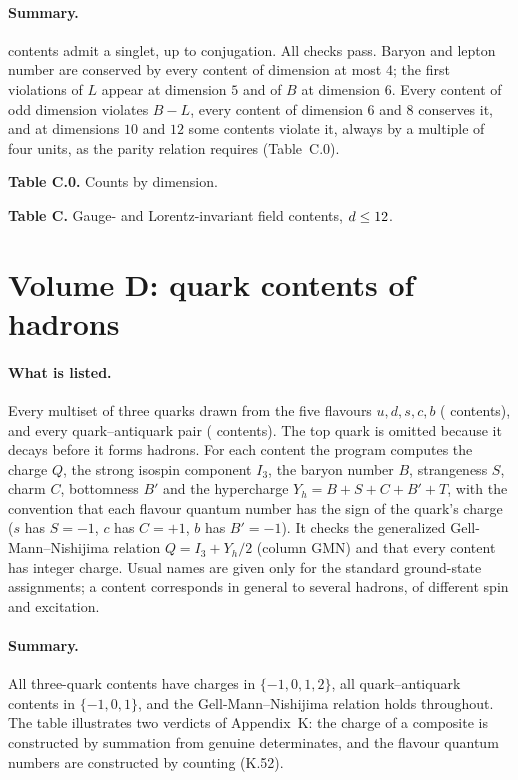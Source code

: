 \paragraph{Summary.} \vvNCfound{} contents admit a singlet, \vvNCreps{} up to conjugation. All checks pass. Baryon and lepton number are conserved by every content of dimension at most $4$; the first violations of $L$ appear at dimension $5$ and of $B$ at dimension $6$. Every content of odd dimension violates $B-L$, every content of dimension $6$ and $8$ conserves it, and at dimensions $10$ and $12$ some contents violate it, always by a multiple of four units, as the parity relation requires (Table~C.0).

\begin{center}\textbf{Table C.0.} Counts by dimension.\end{center}


\begin{center}\textbf{Table C.} Gauge- and Lorentz-invariant field contents, $d \leq 12$.\end{center}


\section{Volume D: quark contents of hadrons}\label{app:d}

\paragraph{What is listed.} Every multiset of three quarks drawn from the five flavours $u, d, s, c, b$ (\vvNDbaryons{} contents), and every quark--antiquark pair (\vvNDmesons{} contents). The top quark is omitted because it decays before it forms hadrons. For each content the program computes the charge $Q$, the strong isospin component $I_3$, the baryon number $B$, strangeness $S$, charm $C$, bottomness $B'$ and the hypercharge $Y_h = B + S + C + B' + T$, with the convention that each flavour quantum number has the sign of the quark's charge ($s$ has $S = -1$, $c$ has $C = +1$, $b$ has $B' = -1$). It checks the generalized Gell-Mann--Nishijima relation $Q = I_3 + Y_h/2$ (column GMN) and that every content has integer charge. Usual names are given only for the standard ground-state assignments; a content corresponds in general to several hadrons, of different spin and excitation.

\paragraph{Summary.} All \vvNDbaryons{} three-quark contents have charges in $\{-1, 0, 1, 2\}$, all quark--antiquark contents in $\{-1, 0, 1\}$, and the Gell-Mann--Nishijima relation holds throughout. The table illustrates two verdicts of Appendix~K: the charge of a composite is constructed by summation from genuine determinates, and the flavour quantum numbers are constructed by counting (K.52).

